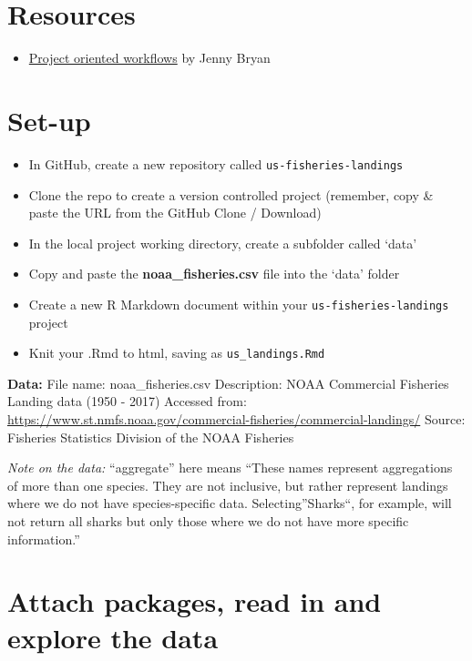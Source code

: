 \documentclass[]{book}
\providecommand{\tightlist}{%
  \setlength{\itemsep}{0pt}\setlength{\parskip}{0pt}}
\begin{document}
\hypertarget{resources-8}{%
\section{Resources}\label{resources-8}}

\begin{itemize}
\tightlist
\item
  \href{https://www.tidyverse.org/blog/2017/12/workflow-vs-script/}{Project oriented workflows} by Jenny Bryan
\end{itemize}

\hypertarget{set-up-1}{%
\section{Set-up}\label{set-up-1}}

\begin{itemize}
\tightlist
\item
  In GitHub, create a new repository called \texttt{us-fisheries-landings}
\item
  Clone the repo to create a version controlled project (remember, copy \& paste the URL from the GitHub Clone / Download)
\item
  In the local project working directory, create a subfolder called `data'
\item
  Copy and paste the \textbf{noaa\_fisheries.csv} file into the `data' folder
\item
  Create a new R Markdown document within your \texttt{us-fisheries-landings} project
\item
  Knit your .Rmd to html, saving as \texttt{us\_landings.Rmd}
\end{itemize}

\textbf{Data:}
File name: noaa\_fisheries.csv
Description: NOAA Commercial Fisheries Landing data (1950 - 2017)
Accessed from: \url{https://www.st.nmfs.noaa.gov/commercial-fisheries/commercial-landings/}
Source: Fisheries Statistics Division of the NOAA Fisheries

\emph{Note on the data:} ``aggregate'' here means ``These names represent aggregations of more than one species. They are not inclusive, but rather represent landings where we do not have species-specific data. Selecting''Sharks``, for example, will not return all sharks but only those where we do not have more specific information.''

\hypertarget{attach-packages-read-in-and-explore-the-data}{%
\section{Attach packages, read in and explore the data}\label{attach-packages-read-in-and-explore-the-data}}
\end{document}
